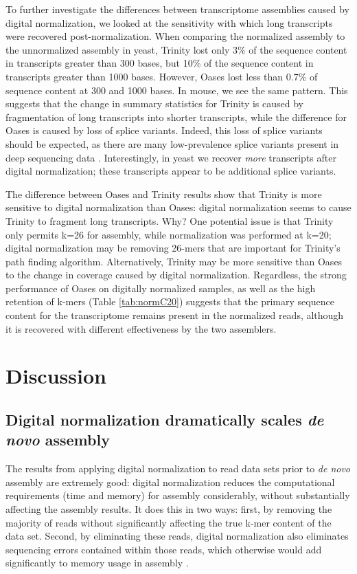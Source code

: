 \documentclass[10pt]{article}
\begin{document}
To further investigate the differences between transcriptome
assemblies caused by digital normalization, we looked at the
sensitivity with which long transcripts were recovered
post-normalization.  When comparing the normalized assembly to the
unnormalized assembly in yeast, Trinity lost only 3\% of the sequence
content in transcripts greater than 300 bases, but 10\% of the
sequence content in transcripts greater than 1000 bases.  However,
Oases lost less than 0.7\% of sequence content at 300 and
1000 bases.  In mouse, we see the same pattern.
This suggests that the change in summary statistics for
Trinity is caused by fragmentation of long transcripts into shorter
transcripts, while the difference for Oases is caused by loss of
splice variants.  Indeed, this
loss of splice variants should be expected, as there are many low-prevalence splice
variants present in deep sequencing data \cite{pubmed21151575}.
Interestingly, in yeast we recover {\em more} transcripts after
digital normalization; these transcripts appear to be additional splice
variants.


The difference between Oases and Trinity results show that Trinity is
more sensitive to digital normalization than Oases: digital
normalization seems to cause Trinity to fragment long transcripts.
Why?  One potential issue is that Trinity only permits k=26 for
assembly, while normalization was performed at k=20; digital
normalization may be removing 26-mers that are important for Trinity's
path finding algorithm.  Alternatively, Trinity may be more sensitive
than Oases to the change in coverage caused by digital normalization.
Regardless, the strong performance of Oases on digitally normalized
samples, as well as the high retention of k-mers (Table \ref{tab:normC20})
suggests that the primary sequence content for the transcriptome remains
present in the normalized reads, although it is recovered with different
effectiveness by the two assemblers.

\section*{Discussion}

\subsection*{Digital normalization dramatically scales {\em de novo} assembly}

The results from applying digital normalization to read data sets
prior to {\em de novo} assembly are extremely good: digital
normalization reduces the computational requirements (time and memory)
for assembly considerably, without substantially affecting the
assembly results.  It does this in two ways: first, by removing
the majority of reads without significantly affecting the true k-mer
content of the data set. Second, by eliminating these reads,
digital normalization also eliminates sequencing errors contained
within those reads, which otherwise would add significantly to memory
usage in assembly \cite{pubmed21245053}.
\end{document}
